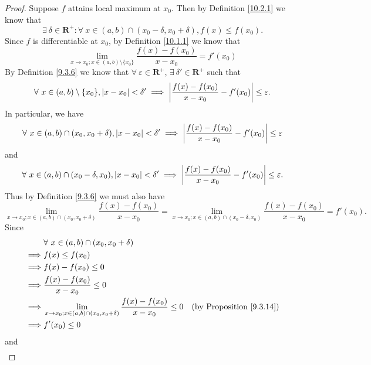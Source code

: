 \begin{proof}
    Suppose \(f\) attains local maximum at \(x_0\).
    Then by Definition \ref{10.2.1} we know that
    \[
        \exists\ \delta \in \mathbf{R}^+ : \forall\ x \in (a, b) \cap (x_0 - \delta, x_0 + \delta), f(x) \leq f(x_0).
    \]
    Since \(f\) is differentiable at \(x_0\), by Definition \ref{10.1.1} we know that
    \[
        \lim_{x \to x_0 ; x \in (a, b) \setminus \{x_0\}} \frac{f(x) - f(x_0)}{x - x_0} = f'(x_0)
    \]
    By Definition \ref{9.3.6} we know that \(\forall\ \varepsilon \in \mathbf{R}^+\), \(\exists\ \delta' \in \mathbf{R}^+\) such that
    \[
        \forall\ x \in (a, b) \setminus \{x_0\}, \abs*{x - x_0} < \delta' \implies \abs*{\frac{f(x) - f(x_0)}{x - x_0} - f'(x_0)} \leq \varepsilon.
    \]
    In particular, we have
    \[
        \forall\ x \in (a, b) \cap (x_0, x_0 + \delta), \abs*{x - x_0} < \delta' \implies \abs*{\frac{f(x) - f(x_0)}{x - x_0} - f'(x_0)} \leq \varepsilon
    \]
    and
    \[
        \forall\ x \in (a, b) \cap (x_0 - \delta, x_0), \abs*{x - x_0} < \delta' \implies \abs*{\frac{f(x) - f(x_0)}{x - x_0} - f'(x_0)} \leq \varepsilon.
    \]
    Thus by Definition \ref{9.3.6} we must also have
    \[
        \lim_{x \to x_0 ; x \in (a, b) \cap (x_0, x_0 + \delta)} \frac{f(x) - f(x_0)}{x - x_0} = \lim_{x \to x_0 ; x \in (a, b) \cap (x_0 - \delta, x_0)} \frac{f(x) - f(x_0)}{x - x_0} = f'(x_0).
    \]
    Since
    \begin{align*}
                 & \forall\ x \in (a, b) \cap (x_0, x_0 + \delta)                                                                                       \\
        \implies & f(x) \leq f(x_0)                                                                                                                     \\
        \implies & f(x) - f(x_0) \leq 0                                                                                                                 \\
        \implies & \frac{f(x) - f(x_0)}{x - x_0} \leq 0                                                                                                 \\
        \implies & \lim_{x \to x_0 ; x \in (a, b) \cap (x_0, x_0 + \delta)} \frac{f(x) - f(x_0)}{x - x_0} \leq 0 & \text{(by Proposition \ref{9.3.14})} \\
        \implies & f'(x_0) \leq 0
    \end{align*}
    and
    \begin{align*}

\end{align*}
\end{proof}
